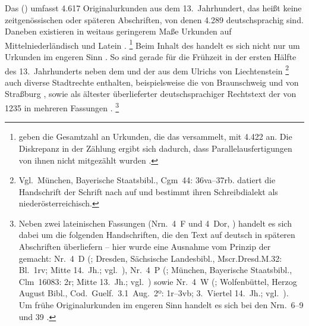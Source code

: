 Das  (\CAO) umfasst 4.617
Originalurkunden aus dem 13.\ Jahrhundert, das heißt keine zeitgenössischen
oder späteren Abschriften, von denen 4.289 deutschsprachig sind. Daneben
existieren in weitaus geringerem Maße Urkunden auf Mittelniederländisch und
Latein \autocites[\RN{1}]{deboor1976}[25]{schulze2011}[40--41]{ganslmayer2012}.%
%
	\footnote{\citet[391]{gniffkerapp2005} geben die Gesamtzahl an Urkunden,
	die das \CAO{} versammelt, mit 4.422 an. Die Diskrepanz in der
	Zählung ergibt sich dadurch, dass Parallelausfertigungen von ihnen nicht
	mitgezählt wurden
	\autocite[vgl.][40]{ganslmayer2012}.\label{fn:caowordcount}}
%
Beim Inhalt des \CAO{} handelt es sich nicht nur um Urkunden im engeren Sinn
\autocite[596]{schmidtwiegand1998b}. So sind gerade für die Frühzeit in der
ersten Hälfte des 13.~Jahrhunderts neben dem 
\autocites(Nr.~1, Erfurt, um 1200)[1,2--10]{cao1} und der  aus
dem  Ulrichs von Liechtenstein
\autocites(Nr.~3, Schloss Liechtenstein, Bz.~Murtal, 1227)[5,13--40]{cao1}%
%
	\footnote{Vgl.\ München, Bayerische Staatsbibl., Cgm~44: 36va--37rb.
	\citet[230--231]{schneider1987} datiert die Handschrift der Schrift
	nach auf  und bestimmt ihren Schreibdialekt als
	niederösterreichisch.}
%
auch diverse Stadtrechte enthalten, beispielsweise die von Braunschweig
\autocites(Nr.~2, 1227)[1,12--5,11]{cao1} und von Straßburg
\autocites(Nr.~N~238~A und B, 1283 bzw.\ Ende 13.~Jh.)[179,21--194.15;
179,29--194,32]{cao5}, sowie als ältester überlieferter deutschsprachiger
Rechtstext der  von 1235 in mehreren Fassungen
\autocites(Nr.~4)[14,11--17,55]{cao1}.%
%
	\footnote{Neben zwei lateinischen Fassungen (Nrn.~4~F und 4~Dor,
	\cite[5,42--9,17; 9,19--12,15]{cao1}) handelt es sich dabei um die
	folgenden Handschriften, die den Text auf deutsch in späteren Abschriften
	überliefern -- hier wurde eine Ausnahme vom Prinzip der 
	gemacht:
	Nr.~4~D
		(\cite[14,11--15,53]{cao1};
		Dresden, Sächsische Landesbibl., Mscr.Dresd.M.32: Bl.~1rv;
		Mitte 14.\ Jh.; vgl.~\cite[7549]{hsc}),
	Nr.~4~P
		(\cite[12,17--14,09]{cao1};
		München, Bayerische Staatsbibl., Clm~16083: 2r;
		Mitte 13.\ Jh.; vgl.~\cites[256]{haas2010}[19293]{hsc}) sowie
	Nr.~4~W
		(\cite[14,11--17,55]{cao1};
		Wolfenbüttel, Herzog August Bibl., Cod.~Guelf.~3.1~Aug.~2º: 1r--3vb;
		3.~Viertel 14.~Jh.; vgl.~\cite[8396]{hsc}).
	Um frühe Originalurkunden im engeren Sinn handelt es sich bei den Nrn.~6--9
	und 39 \autocites[20,44--23,24;
	69,2--21]{cao1}[vgl.][15--16]{bertelsmeierkierst2008}.%
	}
